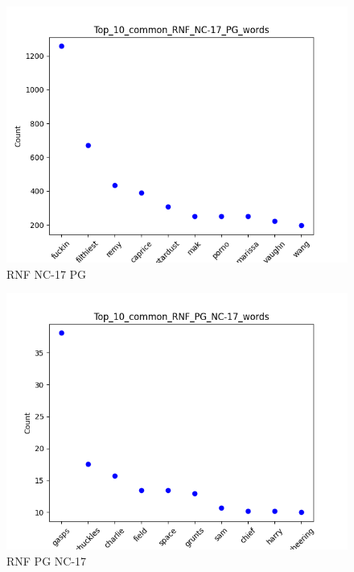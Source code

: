 \documentclass[a4paper]{article}
\begin{document}
\begin{figure}[ht]
    \centering
    \includegraphics[width=1\textwidth]{../stats/Top_10_common_RNF_NC-17_PG_words.png}
    \caption{RNF NC-17 PG}
\end{figure}


\begin{figure}[ht]
    \centering
    \includegraphics[width=1\textwidth]{../stats/Top_10_common_RNF_PG_NC-17_words.png}
    \caption{RNF PG NC-17}
\end{figure}
\end{document}

